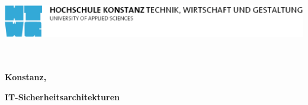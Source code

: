 
\begin{titlepage}

\vspace*{-3.5cm}

\begin{center} %
\hspace*{-1cm} \includegraphics[width=15.7cm]{figures/htwg-logo}
\end{center} %

\vspace{2.5cm}

\begin{center}
	\huge{
		\textbf{\thema} \\[5cm]
	}
	\Large{
		\textbf{\autor}} \\[6.5cm]
	\large{
		\textbf{Konstanz, \abgabedatum} \\[2.3cm]
	}

	\Huge{
		\textbf{{\sf IT-Sicherheitsarchitekturen}}
	}
\end{center}

\end{titlepage}
